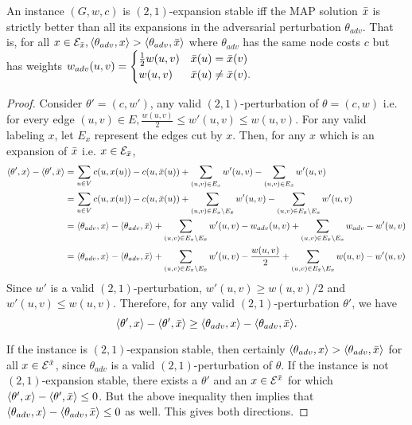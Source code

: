 \begin{claim}\label{exp_worst}
An instance $(G,w,c)$ is $(2,1)$-expansion stable iff the MAP solution $\bar{x}$ is strictly better than all its expansions in the adversarial perturbation $\theta_{adv}$. That is, for all $x \in \mathcal{E}_{\bar{x}}, \langle \theta_{adv},x\rangle > \langle \theta_{adv},\bar{x}\rangle$ where $\theta_{adv}$ has the same node costs $c$ but has weights $
    w_{adv}(u,v) = \begin{cases}
    \frac{1}{2}w(u,v) & \bar{x}(u) = 
    \bar{x}(v)\\
    w(u,v) & \bar{x}(u) \ne \bar{x}(v).
\end{cases}
$
\end{claim}
\begin{proof}
Consider $\theta' = (c,w')$, any valid $(2,1)$-perturbation of $\theta = (c,w)$ i.e. for every edge $(u,v) \in E, \frac{w(u,v)}{2} \leq w'(u,v) \leq w(u,v)$. For any valid labeling $x$, let $E_x$ represent the edges cut by $x$. Then, for any $x$ which is an expansion of $\bar{x}$ i.e. $x \in \mathcal{E}_{\bar{x}}$,
\begin{align*}
    \langle \theta',x\rangle - \langle \theta',\bar{x}\rangle &= \sum_{u \in V} c(u,x(u)) - c(u,\bar{x}(u)) + \sum_{(u,v) \in E_x} w'(u,v) - \sum_{(u,v) \in E_{\bar{x}}} w'(u,v)
    \\&= \sum_{u \in V} c(u,x(u)) - c(u,\bar{x}(u)) + \sum_{(u,v) \in E_x \setminus E_{\bar{x}}} w'(u,v) - \sum_{(u,v) \in E_{\bar{x}}\setminus E_x} w'(u,v)
    \\&= \langle \theta_{adv},x\rangle - \langle \theta_{adv},\bar{x}\rangle + \sum_{(u,v) \in E_x \setminus E_{\bar{x}}} w'(u,v) -w_{adv}(u,v)  + \sum_{(u,v) \in E_{\bar{x}}\setminus E_x} w_{adv} - w'(u,v)
    \\&= \langle \theta_{adv},x\rangle - \langle \theta_{adv},\bar{x}\rangle + \sum_{(u,v) \in E_x \setminus E_{\bar{x}}} w'(u,v) -\frac{w(u,v)}{2}  + \sum_{(u,v) \in E_{\bar{x}}\setminus E_x} w(u,v) - w'(u,v)
\end{align*}
Since $w'$ is a valid $(2,1)$-perturbation, $w'(u,v) \ge w(u,v)/2$ and $w'(u,v) \le w(u,v)$. Therefore, for any valid $(2,1)$-perturbation $\theta'$, we have 
\[
\langle \theta',x\rangle - \langle \theta',\bar{x}\rangle \geq \langle \theta_{adv},x\rangle - \langle \theta_{adv},\bar{x}\rangle.
\]

If the instance is $(2,1)$-expansion stable, then certainly $\langle \theta_{adv},x\rangle > \langle \theta_{adv},\bar{x}\rangle$ for all $x\in \mathcal{E}^{\bar{x}}$, since $\theta_{adv}$ is a valid $(2,1)$-perturbation of $\theta$. If the instance is not $(2,1)$-expansion stable, there exists a $\theta'$ and an $x\in \mathcal{E}^{\bar{x}}$ for which $\langle \theta',x\rangle - \langle \theta',\bar{x}\rangle \le 0$. But the above inequality then implies that $\langle \theta_{adv},x\rangle - \langle \theta_{adv},\bar{x}\rangle \le 0$ as well. This gives both directions.
\end{proof}

